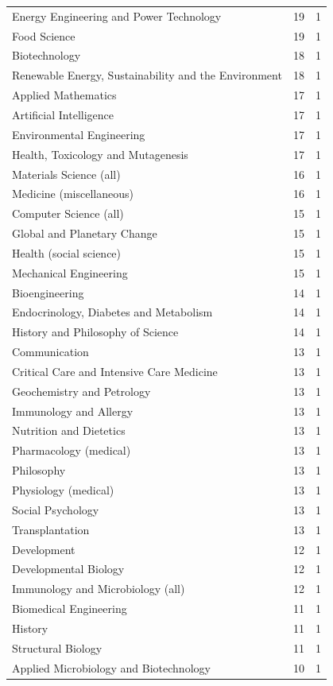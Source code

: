 \documentclass[12pt,brazil]{article}\usepackage[]{graphicx}\usepackage[]{xcolor}
\begin{document}
\begin{longtable}{lrr}
Energy Engineering and Power Technology & 19 & 1 \\
Food Science & 19 & 1 \\
Biotechnology & 18 & 1 \\
Renewable Energy, Sustainability and the Environment & 18 & 1 \\
Applied Mathematics & 17 & 1 \\
Artificial Intelligence & 17 & 1 \\
Environmental Engineering & 17 & 1 \\
Health, Toxicology and Mutagenesis & 17 & 1 \\
Materials Science (all) & 16 & 1 \\
Medicine (miscellaneous) & 16 & 1 \\
Computer Science (all) & 15 & 1 \\
Global and Planetary Change & 15 & 1 \\
Health (social science) & 15 & 1 \\
Mechanical Engineering & 15 & 1 \\
Bioengineering & 14 & 1 \\
Endocrinology, Diabetes and Metabolism & 14 & 1 \\
History and Philosophy of Science & 14 & 1 \\
Communication & 13 & 1 \\
Critical Care and Intensive Care Medicine & 13 & 1 \\
Geochemistry and Petrology & 13 & 1 \\
Immunology and Allergy & 13 & 1 \\
Nutrition and Dietetics & 13 & 1 \\
Pharmacology (medical) & 13 & 1 \\
Philosophy & 13 & 1 \\
Physiology (medical) & 13 & 1 \\
Social Psychology & 13 & 1 \\
Transplantation & 13 & 1 \\
Development & 12 & 1 \\
Developmental Biology & 12 & 1 \\
Immunology and Microbiology (all) & 12 & 1 \\
Biomedical Engineering & 11 & 1 \\
History & 11 & 1 \\
Structural Biology & 11 & 1 \\
Applied Microbiology and Biotechnology & 10 & 1 \\

\end{longtable}
\end{document}
